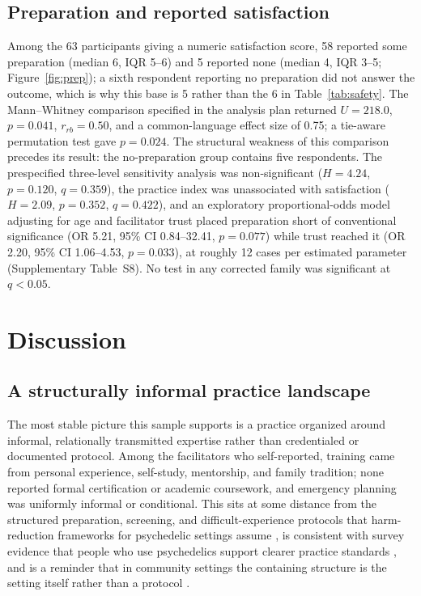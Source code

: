 \documentclass[12pt]{article}
\begin{document}
\subsection{Preparation and reported satisfaction}

Among the 63 participants giving a numeric satisfaction score, 58 reported some preparation (median 6, IQR
5--6) and 5 reported none (median 4, IQR 3--5; Figure~\ref{fig:prep}); a sixth respondent reporting no
preparation did not answer the outcome, which is why this base is 5 rather than the 6 in
Table~\ref{tab:safety}. The Mann--Whitney comparison specified in the analysis plan returned $U=218.0$,
$p=0.041$, $r_{rb}=0.50$, and a common-language effect size of 0.75; a tie-aware permutation test gave
$p=0.024$. The structural weakness of this comparison precedes its result: the no-preparation group
contains five respondents. The prespecified three-level sensitivity analysis was non-significant ($H=4.24$,
$p=0.120$, $q=0.359$), the practice index was unassociated with satisfaction ($H=2.09$, $p=0.352$,
$q=0.422$), and an exploratory proportional-odds model adjusting for age and facilitator trust placed
preparation short of conventional significance (OR 5.21, 95\% CI 0.84--32.41, $p=0.077$) while trust
reached it (OR 2.20, 95\% CI 1.06--4.53, $p=0.033$), at roughly 12 cases per estimated parameter
(Supplementary Table~S8). No test in any corrected family was significant at $q<0.05$.

\section{Discussion}

\subsection{A structurally informal practice landscape}

The most stable picture this sample supports is a practice organized around informal, relationally
transmitted expertise rather than credentialed or documented protocol. Among the facilitators who
self-reported, training came from personal experience, self-study, mentorship, and family tradition; none
reported formal certification or academic coursework, and emergency planning was uniformly informal or
conditional. This sits at some distance from the structured preparation, screening, and difficult-experience
protocols that harm-reduction frameworks for psychedelic settings assume
\citep{gorman2021psychedelic,pilecki2021ethical,dutton2025harm}, is consistent with survey evidence that
people who use psychedelics support clearer practice standards \citep{kruger2023preferences}, and is a
reminder that in community settings the containing structure is the setting itself rather than a protocol
\citep{hartogsohn2017constructing}.
\end{document}
